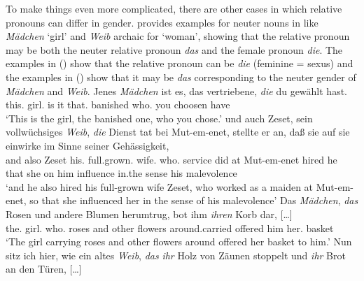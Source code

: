 \documentclass[output=paper
	        ,collection
	        ,collectionchapter
 	        ,biblatex
                ,babelshorthands
                ,newtxmath
                ,draftmode
                ,colorlinks, citecolor=brown
]{langscibook}
\begin{document}
To make things even more complicated, there are other cases in which relative pronouns can differ in gender.
\citet[--418]{Mueller99a} provides examples for neuter nouns in 
like \emph{Mädchen} `girl' and \emph{Weib} archaic for `woman', showing that the relative pronoun may be both the neuter
relative pronoun \emph{das} and the female pronoun \emph{die}. The examples in () show that
the relative pronoun can be \emph{die} (feminine = sexus) and the examples in () show that it
may be \emph{das} corresponding to the neuter gender of \emph{Mädchen} and \emph{Weib}.
\eal
\ex 
\gll Jenes \emph{Mädchen} ist es, das vertriebene, \emph{die} du gewählt hast.\footnotemark\\
    this.\neu{} girl.\neu{} is it that.\neu{} banished who.\fem{} you choosen have\\
\glt `This is the girl, the banished one, who you chose.' 
\ex 
\gll und auch Zeset, sein vollwüchsiges          \emph{Weib}, \emph{die} Dienst tat bei Mut-em-enet, stellte er an, daß sie auf sie einwirke im Sinne seiner Gehässigkeit,\footnotemark\\
     and also Zeset his.\neu{} full.grown.\neu{} wife.\neu{}       who.\fem{} service did at Mut-em-enet  hired   he \partic{} that she on him influence in.the sense his malevolence\\
\glt `and he also hired his full-grown wife Zeset, who worked as a maiden at  Mut-em-enet, so that she influenced her in the sense of his malevolence'
\zl
\eal
\ex 
\gll Das    \emph{Mädchen}, \emph{das} Rosen und andere Blumen herumtrug, bot ihm \emph{ihren} Korb dar, [\ldots]\footnotemark\\
     the.{} girl.\neu{}     who.\neu{} roses and other  flowers around.carried offered him her.\fem{} basket \partic\\
\glt `The girl carrying roses and other flowers around offered her basket to him.'
\ex 
\gll Nun sitz ich hier, wie ein altes \emph{Weib}, \emph{das} \emph{ihr} Holz von Zäunen stoppelt und \emph{ihr} Brot an den Türen, [\ldots]\footnotemark\\
\end{document}
